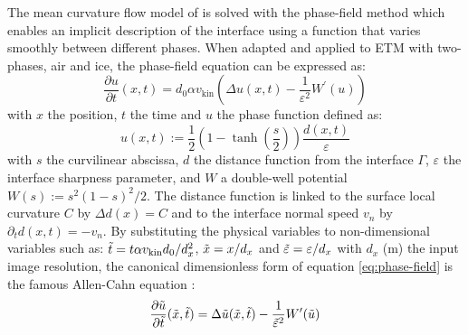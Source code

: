 \documentclass[draft,ms]{agujournal2019}
\begin{document}
The mean curvature flow model of  is solved with the phase-field method which enables an implicit description of the interface using a function that varies smoothly between different phases. When adapted and applied to ETM with two-phases, air and ice, the phase-field equation can be expressed as:\\
\begin{equation}\label{eq:phase-field}\frac{\partial u}{\partial t}(x, t)= d_0 \alpha v_{\mathrm{kin}} \left(\Delta u(x, t)-\frac{1}{\varepsilon^{2}} W^{\prime}(u)\right)\end{equation}
\noindent with $x$ the position, $t$ the time and $u$ the phase function defined as: \begin{equation}\label{eq:phase-func}
u(x,t) := \frac{1}{2}\left(1-\tanh\left(\frac{s}{2}\right)\right)\frac{d(x,t)}{\varepsilon}
\end{equation}
with $s$ the curvilinear  abscissa, $d$ the distance function from the interface $\Gamma$, $\varepsilon$ the interface sharpness parameter, and $W$ a double-well potential $W(s):= s^{2}(1-s)^{2}/2$. The distance function is linked to the surface local curvature $C$ by $\Delta d(x) = C$ and to the interface normal speed $v_n$ by $\partial_t d (x,t) = - v_n$. By substituting the physical variables to non-dimensional variables such as: $\Tilde{t} = t \alpha v_{\mathrm{kin}} d_0 / d_x^2 $, $\Tilde{x} = x/d_x$ and $\Tilde{\varepsilon} = \varepsilon/d_x$ with $d_x$ (m) the input image resolution, the canonical dimensionless form of equation \ref{eq:phase-field} is the famous Allen-Cahn equation \cite{bretin_and_denis_discrete-continuous_2015, kaempfer_phase-field_2009}:
\begin{equation}\label{eq:allen-cahn}\frac{\partial \Tilde{u}}{\partial \Tilde{t}}(\Tilde{x}, \Tilde{t})=\Delta \Tilde{u}(\Tilde{x}, \Tilde{t})-\frac{1}{\Tilde{\varepsilon}^{2}} W^{\prime}(\Tilde{u})\end{equation}

\end{document}
